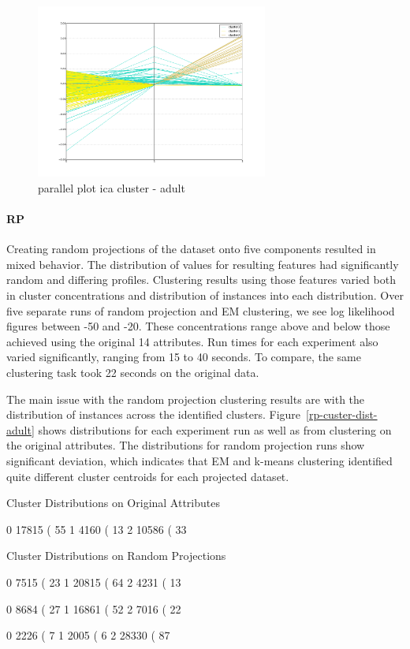 \documentclass{sig-alternate}
\begin{document}
\begin{figure}[!htbp]
    \centering
    \includegraphics[width=3in]{part2/adult/parallel-ica-cluster.pdf}
    \caption{parallel plot ica cluster - adult\label{parallel-ica-cluster}}
\end{figure} 

\paragraph{RP}

Creating random projections of the dataset onto five components resulted in mixed behavior. The distribution of values for resulting features had significantly random and differing profiles. Clustering results using those features varied both in cluster concentrations and distribution of instances into each distribution. Over five separate runs of random projection and EM clustering, we see log likelihood figures between -50 and -20. These concentrations range above and below those achieved using the original 14 attributes. Run times for each experiment also varied significantly, ranging from 15 to 40 seconds. To compare, the same clustering task took 22 seconds on the original data.

The main issue with the random projection clustering results are with the distribution of instances across the identified clusters. Figure~\ref{rp-custer-dist-adult} shows distributions for each experiment run as well as from clustering on the original attributes. The distributions for random projection runs show significant deviation, which indicates that EM and k-means clustering identified quite different cluster centroids for each projected dataset.

\tiny
\begin{verbbox}
Cluster Distributions on Original Attributes

0      17815 ( 55%
1       4160 ( 13%
2      10586 ( 33%

Cluster Distributions on Random Projections

0       7515 ( 23%
1      20815 ( 64%
2       4231 ( 13%

0       8684 ( 27%
1      16861 ( 52%
2       7016 ( 22%

0       2226 (  7%
1       2005 (  6%
2      28330 ( 87%
\end{verbbox}
\normalsize
\end{document}
